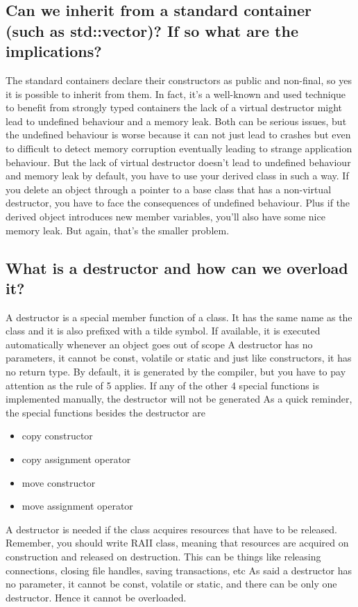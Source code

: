 \documentclass{report}
\begin{document}
\subsection{Can we inherit from a standard container (such as std::vector)? If so what are the implications?}
\bigbreak \noindent 
The standard containers declare their constructors as public and
non-final, so yes it is possible to inherit from them. In fact, it’s
a well-known and used technique to benefit from strongly typed
containers
\bigbreak \noindent 
the lack of a virtual destructor might lead to undefined
behaviour and a memory leak. Both can be serious issues, but the
undefined behaviour is worse because it can not just lead to crashes
but even to difficult to detect memory corruption eventually leading to strange application behaviour.
\bigbreak \noindent 
But the lack of virtual destructor doesn’t lead to undefined behaviour and memory leak by default, you have to use your derived
class in such a way.
\bigbreak \noindent 
If you delete an object through a pointer to a base class that has
a non-virtual destructor, you have to face the consequences of
undefined behaviour. Plus if the derived object introduces new
member variables, you’ll also have some nice memory leak. But
again, that’s the smaller problem.

\bigbreak \noindent 
\subsection{What is a destructor and how can we overload it?}
\bigbreak \noindent 
A destructor is a special member function of a class. It has the same name as the class and it is also prefixed with a tilde symbol. If available, it is executed automatically whenever an object goes out of scope
\bigbreak \noindent 
A destructor has no parameters, it cannot be const, volatile or static and just like constructors, it has no return type.
\bigbreak \noindent 
By default, it is generated by the compiler, but you have to pay
attention as the rule of 5 applies. If any of the other 4 special
functions is implemented manually, the destructor will not be
generated
\bigbreak \noindent 
As a quick reminder, the special functions besides the
destructor are
\begin{itemize}
    \item copy constructor
    \item copy assignment operator
    \item move constructor
    \item move assignment operator
\end{itemize}
\bigbreak \noindent 
A destructor is needed if the class acquires resources that have to
be released. Remember, you should write RAII class, meaning that
resources are acquired on construction and released on destruction.
This can be things like releasing connections, closing file handles,
saving transactions, etc
\bigbreak \noindent 
As said a destructor has no parameter, it cannot be const, volatile
or static, and there can be only one destructor. Hence it cannot be
overloaded.
\end{document}
